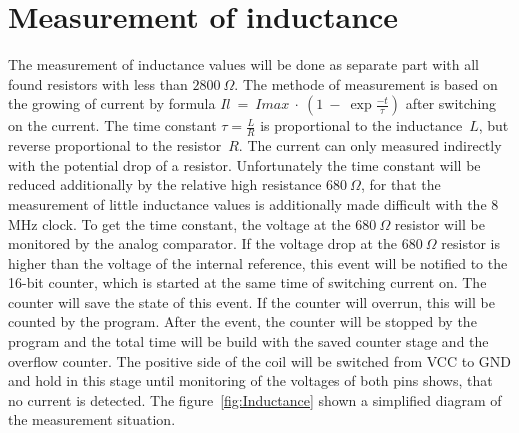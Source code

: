 \section{Measurement of inductance}
The measurement of inductance values will be done as separate part with all found resistors with
less than \(2800~\Omega\).
The methode of measurement is based on the growing of current by formula \(Il~=~Imax~\cdot~(1~-~\exp{\frac{-t}{\tau}})\) 
after switching on the current.
The time constant \(\tau = \frac{L}{R}\) is proportional to the inductance~\(L\), but reverse proportional to the
resistor~\(R\). 
The current can only measured indirectly with the potential drop of a resistor.
Unfortunately the time constant will be reduced additionally by the relative high resistance \(680~\Omega\),
for that the measurement of little inductance values is additionally made difficult with the 8 MHz clock.
To get the time constant, the voltage at the \(680~\Omega\) resistor will be monitored by the analog
comparator.
If the voltage drop at the \(680~\Omega\) resistor is higher than the voltage of the internal reference, this
event will be notified to the 16-bit counter, which is started at the same time of switching current on.
The counter will save the state of this event.
If the counter will overrun, this will be counted by the program.
After the event, the counter will be stopped by the program and the total time will be build with the saved
counter stage and the overflow counter.
The positive side of the coil will be switched from VCC to GND and hold in this stage until  monitoring 
of the voltages of both pins shows, that no current is detected.
The figure~\ref{fig:Inductance} shown a simplified diagram of the measurement situation.


